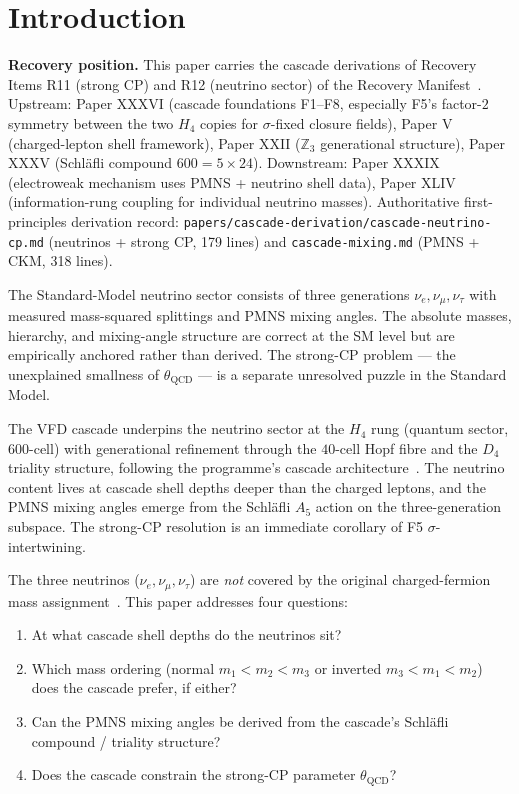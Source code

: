 \documentclass[12pt]{article}
\theoremstyle{definition}
\theoremstyle{remark}
\begin{document}
\section{Introduction}\label{sec:intro}

\textbf{Recovery position.} This paper carries the cascade derivations of Recovery Items R11 (strong CP) and R12 (neutrino sector) of the Recovery Manifest~\citep{RecoveryManifest}. Upstream: Paper XXXVI (cascade foundations F1--F8, especially F5's factor-$2$ symmetry between the two $H_4$ copies for $\sigma$-fixed closure fields), Paper V (charged-lepton shell framework), Paper XXII ($\mathbb{Z}_3$ generational structure), Paper XXXV (Schl\"afli compound $600 = 5 \times 24$). Downstream: Paper XXXIX (electroweak mechanism uses PMNS + neutrino shell data), Paper XLIV (information-rung coupling for individual neutrino masses). Authoritative first-principles derivation record: \texttt{papers/cascade-derivation/cascade-neutrino-cp.md} (neutrinos + strong CP, 179 lines) and \texttt{cascade-mixing.md} (PMNS + CKM, 318 lines).

The Standard-Model neutrino sector consists of three generations $\nu_e, \nu_\mu, \nu_\tau$ with measured mass-squared splittings and PMNS mixing angles. The absolute masses, hierarchy, and mixing-angle structure are correct at the SM level but are empirically anchored rather than derived. The strong-CP problem --- the unexplained smallness of $\theta_{\mathrm{QCD}}$ --- is a separate unresolved puzzle in the Standard Model.

The VFD cascade underpins the neutrino sector at the $H_4$ rung (quantum sector, 600-cell) with generational refinement through the $40$-cell Hopf fibre and the $D_4$ triality structure, following the programme's cascade architecture~\citep{SmartXXXV, SmartXXXVI}. The neutrino content lives at cascade shell depths deeper than the charged leptons, and the PMNS mixing angles emerge from the Schl\"afli $A_5$ action on the three-generation subspace. The strong-CP resolution is an immediate corollary of F5 $\sigma$-intertwining.

The three neutrinos ($\nu_e, \nu_\mu, \nu_\tau$) are \emph{not} covered by the original charged-fermion mass assignment~\citep{SmartV}. This paper addresses four questions:
\begin{enumerate}
\item At what cascade shell depths do the neutrinos sit?
\item Which mass ordering (normal $m_1 < m_2 < m_3$ or inverted $m_3 < m_1 < m_2$) does the cascade prefer, if either?
\item Can the PMNS mixing angles be derived from the cascade's Schl\"afli compound / triality structure?
\item Does the cascade constrain the strong-CP parameter $\theta_{\mathrm{QCD}}$?
\end{enumerate}
\end{document}
